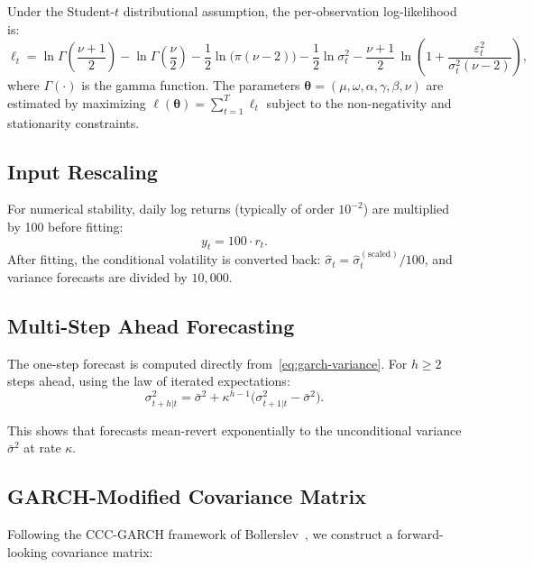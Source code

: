 \documentclass[12pt,a4paper]{article}
\begin{document}
Under the Student-$t$ distributional assumption, the per-observation log-likelihood is:
\begin{equation}
    \ell_t = \ln\Gamma\!\left(\frac{\nu+1}{2}\right) - \ln\Gamma\!\left(\frac{\nu}{2}\right)
    - \frac{1}{2}\ln\bigl(\pi(\nu-2)\bigr)
    - \frac{1}{2}\ln\sigma_t^2
    - \frac{\nu+1}{2}\,\ln\!\left(1 + \frac{\varepsilon_t^2}{\sigma_t^2(\nu-2)}\right),
    \label{eq:garch-loglik}
\end{equation}
where $\Gamma(\cdot)$ is the gamma function. The parameters $\bm{\theta} = (\mu, \omega, \alpha, \gamma, \beta, \nu)$ are estimated by maximizing $\ell(\bm{\theta}) = \sum_{t=1}^T \ell_t$ subject to the non-negativity and stationarity constraints.

\subsection{Input Rescaling}

For numerical stability, daily log returns (typically of order $10^{-2}$) are multiplied by 100 before fitting:
\begin{equation}
    y_t = 100 \cdot r_t.
\end{equation}
After fitting, the conditional volatility is converted back: $\hat{\sigma}_t = \hat{\sigma}_t^{(\text{scaled})} / 100$, and variance forecasts are divided by $10{,}000$.

\subsection{Multi-Step Ahead Forecasting}

The one-step forecast is computed directly from~\eqref{eq:garch-variance}. For $h \geq 2$ steps ahead, using the law of iterated expectations:
\begin{equation}
    \sigma_{t+h|t}^2 = \bar{\sigma}^2 + \kappa^{h-1}\bigl(\sigma_{t+1|t}^2 - \bar{\sigma}^2\bigr).
    \label{eq:garch-forecast}
\end{equation}

This shows that forecasts mean-revert exponentially to the unconditional variance $\bar{\sigma}^2$ at rate $\kappa$.

\subsection{GARCH-Modified Covariance Matrix}
\label{sec:garch-cov}

Following the CCC-GARCH framework of Bollerslev~\cite{bollerslev1990}, we construct a forward-looking covariance matrix:
\end{document}
